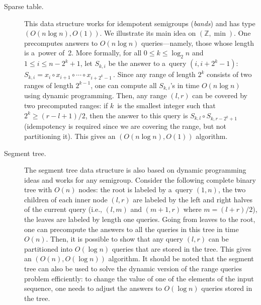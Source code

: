 \documentclass[11pt,letterpaper]{article}
\begin{document}
\begin{description}
\item[Sparse table.] This data structure works for idempotent semigroups ({\em bands}) and has type $(O(n\log n), O(1))$. We illustrate its main idea on $(\mathbb{Z}, \min)$. One precomputes answers to $O(n\log n)$ queries---namely, those whose length is a~power of~2. More formally, for all $0 \le k \le \log_2n$ and $1 \le i \le n-2^k+1$, let $S_{k,i}$ be the answer to a~query $(i, i+2^k-1)$:
\(S_{k,i}=x_i \circ x_{i+1} \circ \dotsb \circ x_{i+2^k-1} \, .\)
Since any range of length $2^k$ consists of two ranges of length $2^{k-1}$, one can compute all $S_{k,i}$'s in time $O(n\log n)$ using dynamic programming. Then, any range $(l,r)$ can be covered by two precomputed ranges: if $k$~is the smallest integer such that $2^k \ge (r-l+1)/2$, then the answer to this query is $S_{k,l} \circ S_{k,r-2^k+1}$ (idempotency is required since we are covering the range, but not partitioning it). This gives an $(O(n\log n), O(1))$ algorithm.


\item[Segment tree.] The segment tree data structure is also based on dynamic programming ideas and works for any semigroup. Consider the following complete binary tree with $O(n)$ nodes: the root is labeled by a~query $(1,n)$, the two children of each inner node $(l,r)$ are labeled by the left and right halves of the current query (i.e., $(l,m)$ and $(m+1,r)$ where $m=(l+r)/2$), the leaves are labeled by length one queries. Going from leaves to the root, one can precompute the answers to all the queries in this tree in time $O(n)$. Then, it is possible to show that any query $(l,r)$ can be  partitioned into $O(\log n)$ queries that are stored in the tree. This gives an $(O(n), O(\log n))$ algorithm. It should be noted that the segment tree can also be used to solve the dynamic version of the range queries problem efficiently: to change the value of one of the elements of the input sequence, one needs to adjust the answers to $O(\log n)$ queries stored in the tree.


\end{description}
\end{document}
